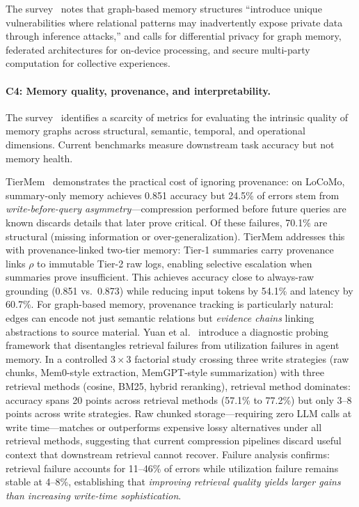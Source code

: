 \documentclass[hf]{ceurart}
\begin{document}
The survey~\cite{graphmemsurvey2026} notes that graph-based memory
structures ``introduce unique vulnerabilities where relational patterns
may inadvertently expose private data through inference attacks,'' and
calls for differential privacy for graph memory, federated
architectures for on-device processing, and secure multi-party
computation for collective experiences.

\paragraph{C4: Memory quality, provenance, and interpretability.}
The survey~\cite{graphmemsurvey2026} identifies a scarcity of metrics
for evaluating the intrinsic quality of memory graphs across
structural, semantic, temporal, and operational dimensions. Current
benchmarks measure downstream task accuracy but not memory health.

TierMem~\cite{tiermem2026} demonstrates the practical cost of
ignoring provenance: on LoCoMo, summary-only memory achieves
0.851 accuracy but 24.5\% of errors stem from \emph{write-before-query
asymmetry}---compression performed before future queries are known
discards details that later prove critical. Of these failures, 70.1\%
are structural (missing information or over-generalization). TierMem
addresses this with provenance-linked two-tier memory: Tier-1
summaries carry provenance links $\rho$ to immutable Tier-2 raw logs,
enabling selective escalation when summaries prove insufficient. This
achieves accuracy close to always-raw grounding (0.851 vs.\ 0.873)
while reducing input tokens by 54.1\% and latency by 60.7\%.
For graph-based memory, provenance tracking is particularly natural:
edges can encode not just semantic relations but
\emph{evidence chains} linking abstractions to source material.
Yuan et al.~\cite{diagnosebottleneck2026} introduce a diagnostic
probing framework that disentangles retrieval failures from
utilization failures in agent memory. In a controlled
$3 \times 3$ factorial study crossing three write strategies (raw
chunks, Mem0-style extraction, MemGPT-style summarization) with
three retrieval methods (cosine, BM25, hybrid reranking), retrieval
method dominates: accuracy spans 20 points across retrieval methods
(57.1\% to 77.2\%) but only 3--8 points across write strategies.
Raw chunked storage---requiring zero LLM calls at write time---matches
or outperforms expensive lossy alternatives under all retrieval
methods, suggesting that current compression pipelines discard
useful context that downstream retrieval cannot recover. Failure
analysis confirms: retrieval failure accounts for 11--46\% of errors
while utilization failure remains stable at 4--8\%, establishing
that \emph{improving retrieval quality yields larger gains than
increasing write-time sophistication}.
\end{document}
